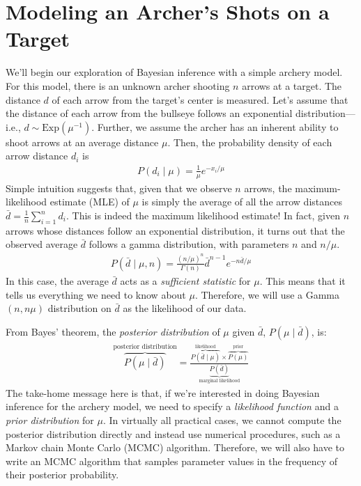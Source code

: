 \section{Modeling an Archer's Shots on a Target}\label{sect:Exercise}

\begin{figure}[h!]
\centering
{}
\label{fig:archery_model}
\end{figure}

We'll begin our exploration of Bayesian inference with a simple archery model.
For this model, there is an unknown archer shooting $n$ arrows at a target. 
The distance $d$ of each arrow from the target's center is measured.
Let's assume that the distance of each arrow from the bullseye follows an exponential distribution---i.e., $d\sim\mbox{Exp}(\mu^{-1})$.
Further, we assume the archer has an inherent ability to shoot arrows at an average distance $\mu$.
Then, the probability density of each arrow distance $d_i$ is
\begin{align*}
P(d_i \mid \mu) = \frac{1}{\mu} e^{-x_i/\mu}
\end{align*}
Simple intuition suggests that, given that we observe $n$ arrows, the maximum-likelihood estimate (MLE) of $\mu$ is simply the average of all the arrow distances $\bar d = \frac{1}{n}\sum_{i=1}^n d_i$.
This is indeed the maximum likelihood estimate!
In fact, given $n$ arrows whose distances follow an exponential distribution, it turns out that the observed average $\bar d$ follows a gamma distribution, with parameters $n$ and $n/\mu$.
\begin{align*}
P(\bar d \mid \mu,n) = \frac{(n/\mu)^n}{\Gamma(n)} {\bar d}^{n-1}e^{-n\bar d /\mu}
\end{align*}
In this case, the average $\bar d$ acts as a \emph{sufficient statistic} for $\mu$. This means that it tells us everything we need to know about $\mu$.
Therefore, we will use a Gamma$(n, n\mu)$ distribution on $\bar d$ as the likelihood of our data.

From Bayes' theorem, the \emph{posterior distribution} of $\mu$ given $\bar d$, $P(\mu \mid \bar d)$, is:
\begin{align*}
\overbrace{P(\mu \mid \bar d)}^{\text{posterior distribution}} = \frac{ \overbrace{P(\bar d \mid \mu)}^{\text{likelihood}} \times \overbrace{P(\mu)}^{\text{prior}}}{\underbrace{P(\bar d)}_{\text{marginal likelihood}}}
\end{align*}
The take-home message here is that, if we're interested in doing Bayesian inference for the archery model, we need to specify a \emph{likelihood function} and a \emph{prior distribution} for $\mu$.
In virtually all practical cases, we cannot compute the posterior distribution directly and instead use numerical procedures, such as a Markov chain Monte Carlo (MCMC) algorithm.
Therefore, we will also have to write an MCMC algorithm that samples parameter values in the frequency of their posterior probability.

